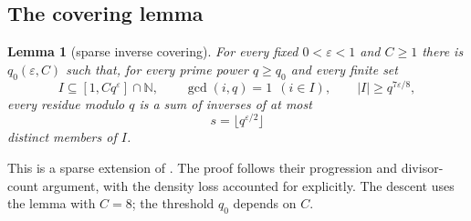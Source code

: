 \documentclass[11pt,letterpaper]{article}
\numberwithin{equation}{section}
\theoremstyle{plain}
\newtheorem{lemma}{Lemma}
\theoremstyle{remark}
\newcommand{\N}{\mathbb N}
\begin{document}
\subsection{The covering lemma}\label{sec:coverlemma}

\begin{lemma}[sparse inverse covering]\label{lem:cover}
For every fixed $0<\varepsilon<1$ and $C\ge1$ there is $q_0(\varepsilon,C)$ such that, for every prime power $q\ge q_0$ and every finite set
\[
I\subseteq[1,Cq^\varepsilon]\cap\N,\qquad \gcd(i,q)=1\ \ (i\in I),\qquad |I|\ge q^{7\varepsilon/8},
\]
every residue modulo $q$ is a sum of inverses of at most
\[
s=\lfloor q^{\varepsilon/2}\rfloor
\]
distinct members of $I$.
\end{lemma}

This is a sparse extension of \cite[Theorem 2]{CFHMPSV}. The proof follows their progression and divisor-count argument, with the density loss accounted for explicitly. The descent uses the lemma with $C=8$; the threshold $q_0$ depends on $C$.
\end{document}
